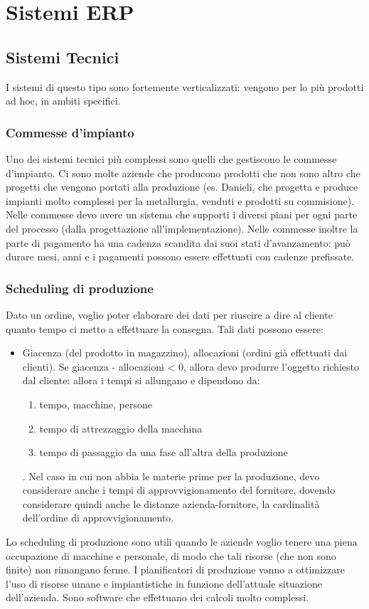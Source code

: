 \chapter{Sistemi ERP}
\label{chap:Sistemi ERP}
\section{Sistemi Tecnici}
\label{sec:Sistemi Tecnici}

I sistemi di questo tipo sono fortemente verticalizzati: vengono
per lo pi\`u prodotti ad hoc, in ambiti specifici.
\subsection{Commesse d'impianto}
\label{sub:Commesse d'impianto}
Uno dei sistemi tecnici pi\`u complessi sono quelli che gestiscono
le commesse d'impianto. Ci sono molte aziende che producono prodotti che
non sono altro che progetti che vengono portati alla produzione (es. Danieli,
che progetta e produce impianti molto complessi per la metallurgia, venduti e
prodotti su commisione).\\
Nelle commesse devo avere un sistema che supporti i diversi piani
per ogni parte del processo (dalla progettazione all'implementazione).
Nelle commesse inoltre la parte di pagamento ha una cadenza scandita dai suoi stati
d'avanzamento: pu\`o durare mesi, anni e i pagamenti possono essere
effettuati con cadenze prefissate.\\
\subsection{Scheduling di produzione}
\label{sub:Scheduling di produzione}
Dato un ordine, voglio poter elaborare dei dati per riuscire a dire
al cliente quanto tempo ci metto a effettuare la consegna. Tali dati possono essere:
\begin{itemize}
  \item Giacenza (del prodotto in magazzino), allocazioni (ordini gi\`a effettuati dai clienti).
  Se giacenza - allocazioni < 0, allora devo produrre l'oggetto richiesto
  dal cliente: allora i tempi si allungano e dipendono da:
  \begin{enumerate}
    \item tempo, macchine, persone
    \item tempo di attrezzaggio della macchina
    \item tempo di passaggio da una fase all'altra della produzione
  \end{enumerate}.
  Nel caso in cui non abbia le materie prime per la produzione, devo considerare
  anche i tempi di approvvigionamento del fornitore, dovendo considerare quindi
  anche le distanze azienda-fornitore, la cardinalit\`a dell'ordine di approvvigionamento.
\end{itemize}
Lo scheduling di produzione sono utili quando le aziende voglio tenere una piena occupazione
di macchine e personale, di modo che tali risorse (che non sono finite) non rimangano ferme.
I pianificatori di produzione vanno a ottimizzare l'uso di risorse umane e impiantistiche in funzione
dell'attuale situazione dell'azienda. Sono software che effettuano dei calcoli molto complessi.
